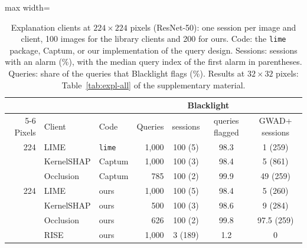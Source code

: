 \begin{table}[!tbp]
\centering\footnotesize\setlength{\tabcolsep}{4pt}
\caption{Explanation clients at $224\times224$ pixels (ResNet-50): one session per image and client, 100 images for the library clients and 200 for ours. Code: the \texttt{lime} package, Captum, or our implementation of the query design. Sessions: sessions with an alarm (\%), with the median query index of the first alarm in parentheses. Queries: share of the queries that Blacklight flags (\%). Results at $32\times32$ pixels: Table~\ref{tab:expl-all} of the supplementary material.}
\label{tab:main-expl}
\vspace{3pt}
\begin{adjustbox}{max width=\textwidth}
\begin{tabular}{rllrccc}
\toprule
& & & & \multicolumn{2}{c}{Blacklight} & \\
\cmidrule(lr){5-6}
Pixels & Client & Code & Queries & sessions & queries flagged & GWAD+ sessions \\
\midrule
224 & LIME & \texttt{lime} & 1{,}000 & 100 (5) & 98.3 & 1 (259) \\
 & KernelSHAP & Captum & 1{,}000 & 100 (3) & 98.4 & 5 (861) \\
 & Occlusion & Captum & 785 & 100 (2) & 99.9 & 49 (259) \\[2pt]
224 & LIME & ours & 1{,}000 & 100 (5) & 98.4 & 5 (260) \\
 & KernelSHAP & ours & 500 & 100 (3) & 98.6 & 9 (284) \\
 & Occlusion & ours & 626 & 100 (2) & 99.8 & 97.5 (259) \\
 & RISE & ours & 1{,}000 & 3 (189) & 1.2 & 0 \\
\bottomrule
\end{tabular}
\end{adjustbox}
\end{table}
